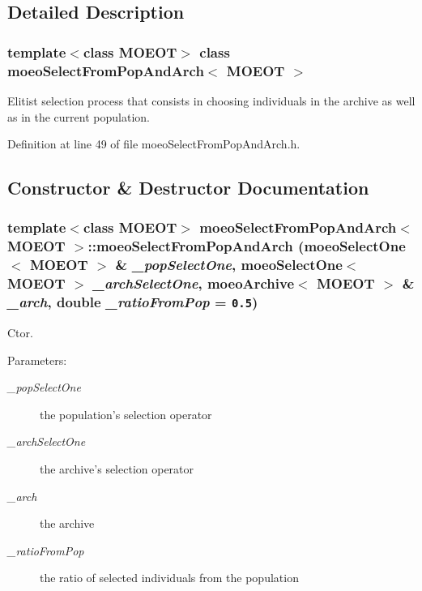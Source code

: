 \subsection{Detailed Description}
\subsubsection*{template$<$class MOEOT$>$ class moeo\-Select\-From\-Pop\-And\-Arch$<$ MOEOT $>$}

Elitist selection process that consists in choosing individuals in the archive as well as in the current population. 



Definition at line 49 of file moeo\-Select\-From\-Pop\-And\-Arch.h.

\subsection{Constructor \& Destructor Documentation}
\subsubsection{\setlength{\rightskip}{0pt plus 5cm}template$<$class MOEOT$>$ \bf{moeo\-Select\-From\-Pop\-And\-Arch}$<$ MOEOT $>$::\bf{moeo\-Select\-From\-Pop\-And\-Arch} (\bf{moeo\-Select\-One}$<$ MOEOT $>$ \& {\em \_\-pop\-Select\-One}, \bf{moeo\-Select\-One}$<$ MOEOT $>$ {\em \_\-arch\-Select\-One}, \bf{moeo\-Archive}$<$ MOEOT $>$ \& {\em \_\-arch}, double {\em \_\-ratio\-From\-Pop} = {\tt 0.5})\hspace{0.3cm}{\tt  [inline]}}\label{classmoeoSelectFromPopAndArch_96b34f67d678a7df7610f28bf10c4e86}


Ctor. 

\begin{Desc}
\item[Parameters:]
\begin{description}
\item[{\em \_\-pop\-Select\-One}]the population's selection operator \item[{\em \_\-arch\-Select\-One}]the archive's selection operator \item[{\em \_\-arch}]the archive \item[{\em \_\-ratio\-From\-Pop}]the ratio of selected individuals from the population \end{description}
\end{Desc}


